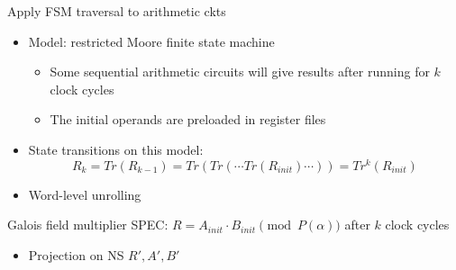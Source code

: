 \documentclass[xcolor=dvipsnames]{beamer}
\newcommand{\bi}{\begin{itemize}}
\newcommand{\ei}{\end{itemize}}
\begin{document}
\begin{frame}[label = Moore]{\large{Apply FSM traversal to arithmetic ckts}}
\vspace{-0.1in}
\begin{figure}[hbt]
\end{figure}
\vspace{-0.4in}
\bi
\item Model: restricted Moore finite state machine
	\bi
	\item Some sequential arithmetic circuits will give results after running for $k$ clock cycles
	\item The initial operands are preloaded in register files
	\ei
\item State transitions on this model:
$$R_{k} = Tr(R_{k-1}) = Tr(Tr(\cdots Tr(R_{init})\cdots)) = Tr^k(R_{init})$$
\item Word-level unrolling
\ei
\hyperlink{motiv2}{}
\end{frame}
\begin{frame}{\large{Galois field multiplier}}
SPEC: $R = A_{init}\cdot B_{init} \pmod {P(\alpha)}$ after $k$ clock cycles
\hspace{-0.3in}\begin{figure}[hbt]
\end{figure}
\bi
\item Projection on NS $R',A',B'$
\ei
\end{frame}
\end{document}
